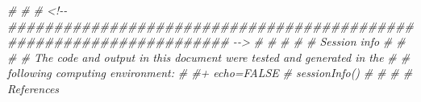 \documentclass[
]{article}
\newenvironment{Shaded}{\begin{snugshade}}{\end{snugshade}}
\newcommand{\CommentTok}[1]{\textcolor[rgb]{0.56,0.35,0.01}{\textit{#1}}}
\begin{document}
\begin{Shaded}
\begin{Highlighting}[]
\CommentTok{\# }
\CommentTok{\# \#\textquotesingle{} <!{-}{-} \#\#\#\#\#\#\#\#\#\#\#\#\#\#\#\#\#\#\#\#\#\#\#\#\#\#\#\#\#\#\#\#\#\#\#\#\#\#\#\#\#\#\#\#\#\#\#\#\#\#\#\#\#\#\#\#\#\#\#\#\#\#\#\#\#\#\#\# {-}{-}>}
\CommentTok{\# \#\textquotesingle{}}
\CommentTok{\# \#\textquotesingle{} \# Session info}
\CommentTok{\# \#\textquotesingle{}}
\CommentTok{\# \#\textquotesingle{} The code and output in this document were tested and generated in the}
\CommentTok{\# \#\textquotesingle{} following computing environment:}
\CommentTok{\# \#+ echo=FALSE}
\CommentTok{\# sessionInfo()}
\CommentTok{\# }
\CommentTok{\# \#\textquotesingle{} \# References}
\end{Highlighting}
\end{Shaded}
\end{document}
